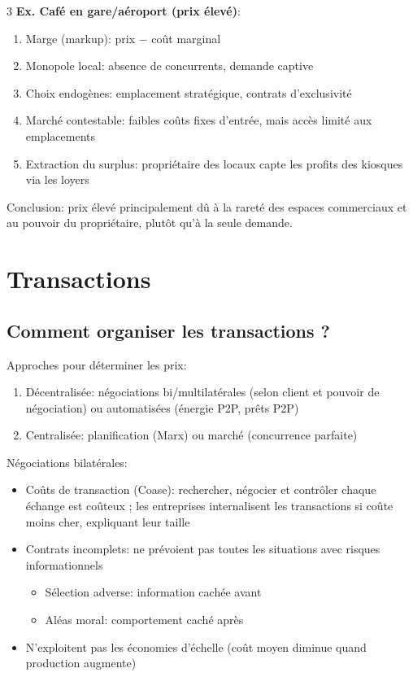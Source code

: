 \documentclass[12pt, a4paper]{article}
\begin{document}
\begin{multicols*}{3}
\textbf{Ex. Café en gare/aéroport (prix élevé)}:
\begin{enumerate}[\roman*.]
  \item Marge (markup): prix $-$ coût marginal
  \item Monopole local: absence de concurrents, demande captive
  \item Choix endogènes: emplacement stratégique, contrats d'exclusivité
  \item Marché contestable: faibles coûts fixes d'entrée, mais accès limité aux emplacements
  \item Extraction du surplus: propriétaire des locaux capte les profits des kiosques via les loyers
\end{enumerate}
Conclusion: prix élevé principalement dû à la rareté des espaces commerciaux et au pouvoir du propriétaire, plutôt qu'à la seule demande.

\colbreak
\section{Transactions}

\subsection{Comment organiser les transactions ?}

Approches pour déterminer les prix:
\begin{enumerate}[\roman*.]
  \item Décentralisée: négociations bi/multilatérales (selon client et pouvoir de négociation) ou automatisées (énergie P2P, prêts P2P)
  \item Centralisée: planification (Marx) ou marché (concurrence parfaite)
\end{enumerate}

Négociations bilatérales:
\begin{itemize}[$-$]
  \item Coûts de transaction (Coase): rechercher, négocier et contrôler chaque échange est coûteux ; les entreprises internalisent les transactions si coûte moins cher, expliquant leur taille 
  \item Contrats incomplets: ne prévoient pas toutes les situations avec risques informationnels 
    \begin{itemize}[topsep=0.5em]
      \item Sélection adverse: information cachée avant
      \item Aléas moral: comportement caché après 
    \end{itemize}
  \item N'exploitent pas les économies d'échelle (coût moyen diminue quand production augmente)
\end{itemize}


\end{multicols*}
\end{document}
